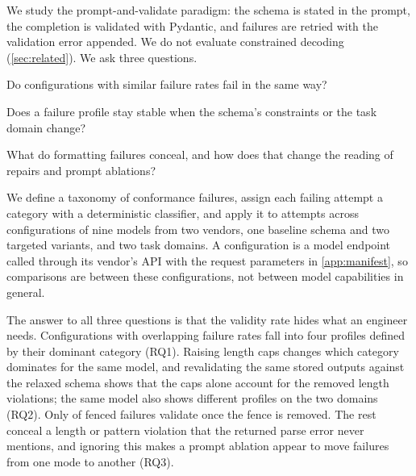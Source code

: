 We study the prompt-and-validate paradigm: the schema is stated in the
prompt, the completion is validated with Pydantic, and failures are
retried with the validation error appended. We do not evaluate
constrained decoding (\cref{sec:related}). We ask three questions.
\begin{description}[leftmargin=1.4em,itemsep=1pt,topsep=2pt,font=\normalfont\bfseries]
  \item[RQ1] Do configurations with similar failure rates fail in the
  same way?
  \item[RQ2] Does a failure profile stay stable when the schema's
  constraints or the task domain change?
  \item[RQ3] What do formatting failures conceal, and how does that
  change the reading of repairs and prompt ablations?
\end{description}
We define a taxonomy of conformance failures, assign each failing attempt
a category with a deterministic classifier, and apply it to
 attempts across  configurations
of nine models from two vendors, one baseline schema and
two targeted variants, and two task domains. A configuration is a model
endpoint called through its vendor's API with the request parameters in
\cref{app:manifest}, so comparisons are between these configurations, not
between model capabilities in general.

The answer to all three questions is that the validity rate hides what an
engineer needs. Configurations with overlapping failure rates fall into
four profiles defined by their dominant category (RQ1). Raising length
caps changes which category dominates for the same model, and revalidating
the same stored outputs against the relaxed schema shows that the caps
alone account for the removed length violations; the same model also
shows different profiles on the two domains (RQ2). Only
 of fenced failures validate once the fence
is removed. The rest conceal a length or pattern violation that the
returned parse error never mentions, and ignoring this makes a prompt
ablation appear to move failures from one mode to another (RQ3).

